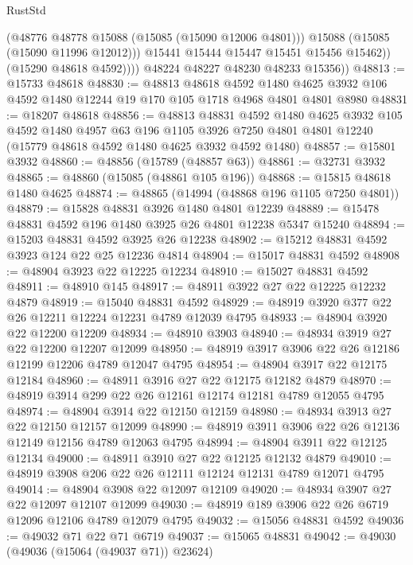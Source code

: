 \begin{lexlean}{RustStd}
\begin{coremodule}
                    (@48776 @48778 @15088 (@15085 (@15090 @12006 @4801)))
                    @15088
                    (@15085 (@15090 @11996 @12012)))
                  @15441
                  @15444
                  @15447
                  @15451
                  @15456
                  @15462))
              (@15290 @48618 @4592))))
        @48224
        @48227
        @48230
        @48233
        @15356))
@48813 := @15733 @48618
@48830 := @48813
    @48618
    @4592
    @1480
    @4625
    @3932
    @106
    @4592
    @1480
    @12244
    @19
    @170
    @105
    @1718
    @4968
    @4801
    @4801
    @8980
@48831 := @18207 @48618
@48856 := @48813
    @48831
    @4592
    @1480
    @4625
    @3932
    @105
    @4592
    @1480
    @4957
    @63
    @196
    @1105
    @3926
    @7250
    @4801
    @4801
    @12240
    (@15779 @48618 @4592 @1480 @4625 @3932 @4592 @1480)
@48857 := @15801 @3932
@48860 := @48856 (@15789 (@48857 @63))
@48861 := @32731 @3932
@48865 := @48860 (@15085 (@48861 @105 @196))
@48868 := @15815 @48618 @1480 @4625
@48874 := @48865 (@14994 (@48868 @196 @1105 @7250 @4801))
@48879 := @15828 @48831 @3926 @1480 @4801 @12239
@48889 := @15478 @48831 @4592 @196 @1480 @3925 @26 @4801 @12238 @5347 @15240
@48894 := @15203 @48831 @4592 @3925 @26 @12238
@48902 := @15212 @48831 @4592 @3923 @124 @22 @25 @12236 @4814
@48904 := @15017 @48831 @4592
@48908 := @48904 @3923 @22 @12225 @12234
@48910 := @15027 @48831 @4592
@48911 := @48910 @145
@48917 := @48911 @3922 @27 @22 @12225 @12232 @4879
@48919 := @15040 @48831 @4592
@48929 := @48919 @3920 @377 @22 @26 @12211 @12224 @12231 @4789 @12039 @4795
@48933 := @48904 @3920 @22 @12200 @12209
@48934 := @48910 @3903
@48940 := @48934 @3919 @27 @22 @12200 @12207 @12099
@48950 := @48919 @3917 @3906 @22 @26 @12186 @12199 @12206 @4789 @12047 @4795
@48954 := @48904 @3917 @22 @12175 @12184
@48960 := @48911 @3916 @27 @22 @12175 @12182 @4879
@48970 := @48919 @3914 @299 @22 @26 @12161 @12174 @12181 @4789 @12055 @4795
@48974 := @48904 @3914 @22 @12150 @12159
@48980 := @48934 @3913 @27 @22 @12150 @12157 @12099
@48990 := @48919 @3911 @3906 @22 @26 @12136 @12149 @12156 @4789 @12063 @4795
@48994 := @48904 @3911 @22 @12125 @12134
@49000 := @48911 @3910 @27 @22 @12125 @12132 @4879
@49010 := @48919 @3908 @206 @22 @26 @12111 @12124 @12131 @4789 @12071 @4795
@49014 := @48904 @3908 @22 @12097 @12109
@49020 := @48934 @3907 @27 @22 @12097 @12107 @12099
@49030 := @48919 @189 @3906 @22 @26 @6719 @12096 @12106 @4789 @12079 @4795
@49032 := @15056 @48831 @4592
@49036 := @49032 @71 @22 @71 @6719
@49037 := @15065 @48831
@49042 := @49030 (@49036 (@15064 (@49037 @71)) @23624)

\end{coremodule}
\end{lexlean}
